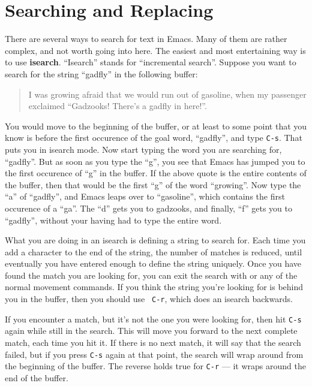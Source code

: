 \section{Searching and Replacing}

There are several ways to search for text in Emacs.  Many of them are
rather complex, and not worth going into here.  The easiest and most
entertaining way is to use {\bf isearch}.
``Isearch'' stands for ``incremental search''.  Suppose you want to
search for the string ``gadfly'' in the following buffer:

\begin{quote}
   \begin{tt}
        I was growing afraid that we would run out of gasoline, when
my passenger exclaimed ``Gadzooks!  There's a gadfly in here!''.
   \end{tt}
\end{quote}

You would move to the beginning of the buffer, or at least to some
point that you know is before the first occurence of the goal word,
``gadfly'', and type {\tt C-s}.  That puts you in isearch mode.  Now
start typing the word you are searching for, ``gadfly''.  But as soon
as you type the ``g'', you see that Emacs has jumped you to the first
occurence of ``g'' in the buffer.  If the above quote is the entire
contents of the buffer, then that would be the first ``g'' of the word
``growing''.  Now type the ``a'' of ``gadfly'', and Emacs leaps over
to ``gasoline'', which contains the first occurence of a ``ga''.  The
``d'' gets you to gadzooks, and finally, ``f'' gets you to ``gadfly'',
without your having had to type the entire word.

        What you are doing in an isearch is defining a string to
search for.  Each time you add a character to the end of the string,
the number of matches is reduced, until eventually you have entered
enough to define the string uniquely.  Once you have found the match
you are looking for, you can exit the search with  or any
of the normal movement commands.  If you think the string you're
looking for is behind you in the buffer, then you should use {\tt
C-r}, which does an isearch backwards.

        If you encounter a match, but it's not the one you were
looking for, then hit {\tt C-s} again while still in the search.  This
will move you forward to the next complete match, each time you hit
it.  If there is no next match, it will say that the search failed,
but if you press {\tt C-s} again at that point, the search will wrap
around from the beginning of the buffer.  The reverse holds true for
{\tt C-r} --- it wraps around the end of the buffer.

